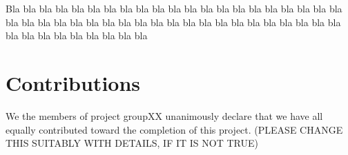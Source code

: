 \documentclass[a4paper,12pt]{article}
\begin{document}
Bla bla bla bla bla bla bla bla bla bla bla bla bla bla bla bla bla 
bla bla bla bla bla bla bla bla bla bla bla bla bla bla bla bla bla 
bla bla bla bla bla bla bla bla bla bla bla bla bla bla bla bla bla 


\section{Contributions}
\label{sec:contributions}
We the members of project groupXX unanimously declare that 
we have all equally contributed toward the completion of this
project. (PLEASE CHANGE THIS SUITABLY WITH DETAILS, IF IT IS NOT TRUE)




\end{document}
